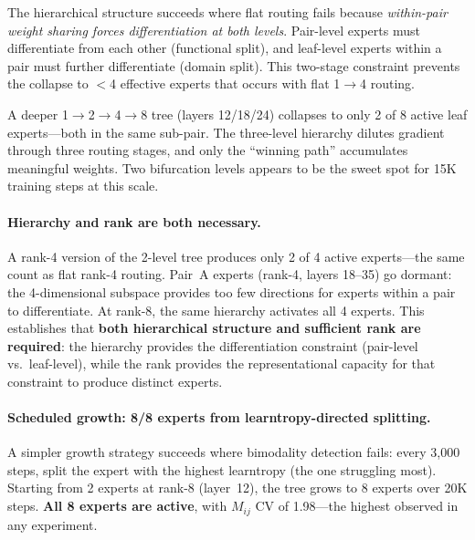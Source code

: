 \documentclass{article}
\begin{document}
The hierarchical structure succeeds where flat routing fails because
\emph{within-pair weight sharing forces differentiation at both levels}.
Pair-level experts must differentiate from each other (functional split),
and leaf-level experts within a pair must further differentiate (domain
split). This two-stage constraint prevents the collapse to $<$4 effective
experts that occurs with flat 1$\to$4 routing.

A deeper 1$\to$2$\to$4$\to$8 tree (layers 12/18/24) collapses to only 2 of
8 active leaf experts---both in the same sub-pair. The three-level hierarchy
dilutes gradient through three routing stages, and only the ``winning path''
accumulates meaningful weights. Two bifurcation levels appears to be the
sweet spot for 15K training steps at this scale.

\paragraph{Hierarchy and rank are both necessary.}
A rank-4 version of the 2-level tree produces only 2 of 4 active
experts---the same count as flat rank-4 routing. Pair~A experts (rank-4,
layers 18--35) go dormant: the 4-dimensional subspace provides too few
directions for experts within a pair to differentiate. At rank-8, the same
hierarchy activates all 4 experts. This establishes that \textbf{both
hierarchical structure and sufficient rank are required}: the hierarchy
provides the differentiation constraint (pair-level vs.\ leaf-level),
while the rank provides the representational capacity for that constraint
to produce distinct experts.

\paragraph{Scheduled growth: 8/8 experts from learntropy-directed splitting.}
A simpler growth strategy succeeds where bimodality detection fails:
every 3,000 steps, split the expert with the highest learntropy (the one
struggling most). Starting from 2 experts at rank-8 (layer~12), the tree
grows to 8 experts over 20K steps. \textbf{All 8 experts are active},
with $M_{ij}$ CV of 1.98---the highest observed in any experiment.
\end{document}

